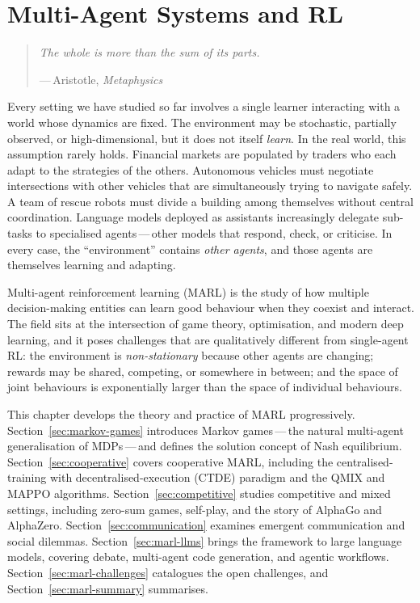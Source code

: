 
\chapter{Multi-Agent Systems and RL}
\label{ch:agents}

\begin{quote}
\itshape
The whole is more than the sum of its parts.
\par\medskip
\upshape\raggedleft
---\,Aristotle, \textit{Metaphysics}
\end{quote}

\bigskip

Every setting we have studied so far involves a single learner interacting
with a world whose dynamics are fixed. The environment may be
stochastic, partially observed, or high-dimensional, but it does not
itself \emph{learn}. In the real world, this assumption rarely holds.
Financial markets are populated by traders who each adapt to the
strategies of the others. Autonomous vehicles must negotiate
intersections with other vehicles that are simultaneously trying to
navigate safely. A team of rescue robots must divide a building among
themselves without central coordination. Language models deployed as
assistants increasingly delegate sub-tasks to specialised
agents\,---\,other models that respond, check, or criticise. In every
case, the ``environment'' contains \emph{other agents}, and those agents
are themselves learning and adapting.

Multi-agent reinforcement learning (MARL)
is the study of how multiple decision-making entities can learn good
behaviour when they coexist and interact. The field sits at the
intersection of game theory, optimisation, and modern deep learning,
and it poses challenges that are qualitatively different from
single-agent RL: the environment is \emph{non-stationary} because
other agents are changing; rewards may be shared, competing, or
somewhere in between; and the space of joint behaviours is
exponentially larger than the space of individual behaviours.

This chapter develops the theory and practice of MARL progressively.
Section~\ref{sec:markov-games} introduces Markov games\,---\,the
natural multi-agent generalisation of MDPs\,---\,and defines the
solution concept of Nash equilibrium. Section~\ref{sec:cooperative}
covers cooperative MARL, including the centralised-training
with decentralised-execution (CTDE) paradigm and the QMIX and MAPPO
algorithms. Section~\ref{sec:competitive} studies competitive and
mixed settings, including zero-sum games, self-play, and the story of
AlphaGo and AlphaZero. Section~\ref{sec:communication} examines
emergent communication and social dilemmas.
Section~\ref{sec:marl-llms} brings the framework to large language
models, covering debate, multi-agent code generation, and agentic
workflows. Section~\ref{sec:marl-challenges} catalogues the open
challenges, and Section~\ref{sec:marl-summary} summarises.

